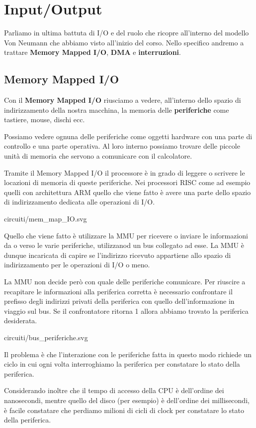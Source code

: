 \chapter{Input/Output}
Parliamo in ultima battuta di I/O e del ruolo che ricopre all'interno del modello Von Neumann che
abbiamo visto all'inizio del corso. Nello specifico andremo a trattare \textbf{Memory Mapped I/O},
\textbf{DMA} e \textbf{interruzioni}.

\section{Memory Mapped I/O}
Con il \textbf{Memory Mapped I/O} riusciamo a vedere, all'interno dello spazio di indirizzamento
della nostra macchina, la memoria delle \textbf{periferiche} come tastiere, mouse, dischi ecc.

Possiamo vedere ognuna delle periferiche come oggetti hardware con una parte di controllo e una
parte operativa. Al loro interno possiamo trovare delle piccole unità di memoria che servono a
comunicare con il calcolatore.

Tramite il Memory Mapped I/O il processore è in grado di leggere o scrivere le locazioni di memoria
di queste periferiche. Nei processori RISC come ad esempio quelli con architettura ARM quello che
viene fatto è avere una parte dello spazio di indirizzamento dedicata alle operazioni di I/O.
\begin{center}
	 {circuiti/mem_map_IO.svg}
\end{center}
Quello che viene fatto è utilizzare la MMU per ricevere o inviare le informazioni da o verso le
varie periferiche, utilizzanod un bus collegato ad esse. La MMU è dunque incaricata di capire se
l'indirizzo ricevuto appartiene allo spazio di indirizzamento per le operazioni di I/O o meno.

La MMU non decide però con quale delle periferiche comunicare. Per riuscire a recapitare le
informazioni alla periferica corretta è necessario confrontare il prefisso degli indirizzi privati
della periferica con quello dell'informazione in viaggio sul bus. Se il confrontatore ritorna 1
allora abbiamo trovato la periferica desiderata.
\begin{center}
	 {circuiti/bus_periferiche.svg}
\end{center}
Il problema è che l'interazione con le periferiche fatta in questo modo richiede un ciclo in cui
ogni volta interroghiamo la periferica per constatare lo stato della periferica.

Considerando inoltre che il tempo di accesso della CPU è dell'ordine dei nanosecondi, mentre quello
del disco (per esempio) è dell'ordine dei millisecondi, è facile constatare che perdiamo milioni
di cicli di clock per constatare lo stato della periferica.
